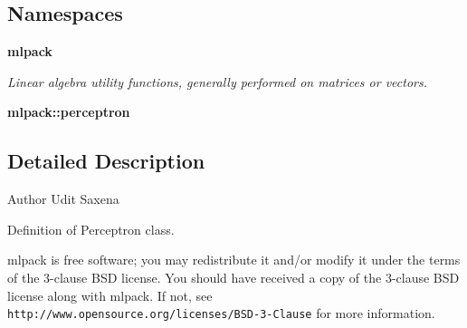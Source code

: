 \subsection*{Namespaces}
\begin{DoxyCompactItemize}
\item 
 \textbf{ mlpack}
\begin{DoxyCompactList}\small\item\em Linear algebra utility functions, generally performed on matrices or vectors. \end{DoxyCompactList}\item 
 \textbf{ mlpack\+::perceptron}
\end{DoxyCompactItemize}


\subsection{Detailed Description}
\begin{DoxyAuthor}{Author}
Udit Saxena
\end{DoxyAuthor}
Definition of Perceptron class.

mlpack is free software; you may redistribute it and/or modify it under the terms of the 3-\/clause B\+SD license. You should have received a copy of the 3-\/clause B\+SD license along with mlpack. If not, see {\tt http\+://www.\+opensource.\+org/licenses/\+B\+S\+D-\/3-\/\+Clause} for more information. 